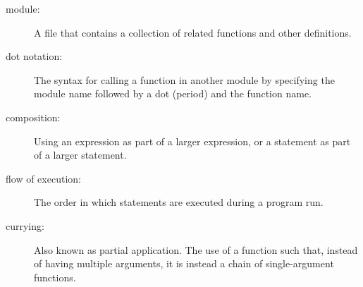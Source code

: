 \documentclass[10pt]{book}
\begin{document}
\begin{description}


\item[module:] A file that contains a
collection of related functions and other definitions.



\item[dot notation:]  The syntax for calling a function in another
module by specifying the module name followed by a dot (period) and
the function name.

\item[composition:] Using an expression as part of a larger expression,
or a statement as part of a larger statement.

\item[flow of execution:]  The order in which statements are executed during
a program run.




\item[currying:] Also known as partial application. The use of a function
such that, instead of having multiple arguments, it is instead a chain of 
single-argument functions.

\end{description}
\end{document}
